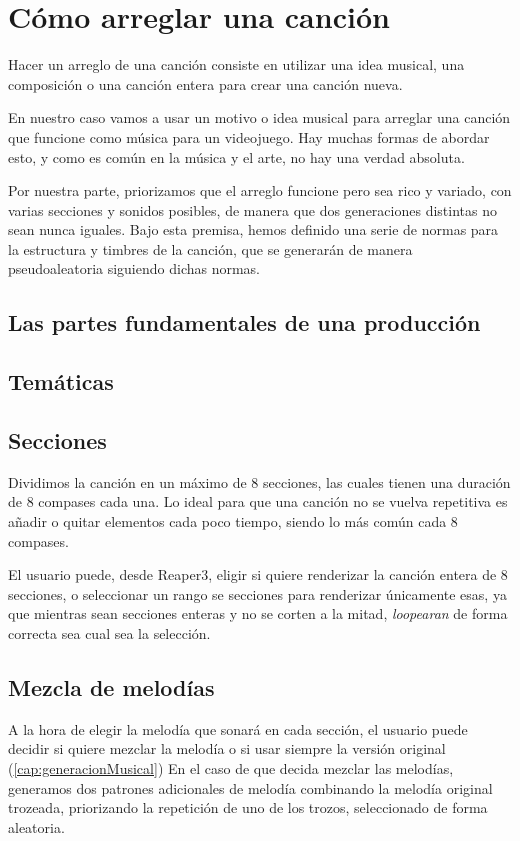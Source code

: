 \chapter{Cómo arreglar una canción}
Hacer un arreglo de una canción consiste en utilizar una idea musical, una composición o una canción entera para crear una canción nueva.

En nuestro caso vamos a usar un motivo o idea musical para arreglar una canción que funcione como música para un videojuego. Hay muchas formas de abordar esto, y como es común en la música y el arte, no hay una verdad absoluta.

Por nuestra parte, priorizamos que el arreglo funcione pero sea rico y variado, con varias secciones y sonidos posibles, de manera que dos generaciones distintas no sean nunca iguales. Bajo esta premisa, hemos definido una serie de normas para la estructura y timbres de la canción, que se generarán de manera pseudoaleatoria siguiendo dichas normas.

\section{Las partes fundamentales de una producción}
\label{sec:fundamentos-producccion-musical}

\section{Temáticas}
\label{sec:tematicas}

\section{Secciones}
\label{sec:secciones}

Dividimos la canción en un máximo de 8 secciones, las cuales tienen una duración de 8 compases cada una. Lo ideal para que una canción no se vuelva repetitiva es añadir o quitar elementos cada poco tiempo, siendo lo más común cada 8 compases.

El usuario puede, desde Reaper3, eligir si quiere renderizar la canción entera de 8 secciones, o seleccionar un rango se secciones para renderizar únicamente esas, ya que mientras sean secciones enteras y no se corten a la mitad, \textit{loopearan} de forma correcta sea cual sea la selección.

\section{Mezcla de melodías}
A la hora de elegir la melodía que sonará en cada sección, el usuario puede decidir si quiere mezclar la melodía o si usar siempre la versión original (\ref{cap:generacionMusical})
En el caso de que decida mezclar las melodías, generamos dos patrones adicionales de melodía combinando la melodía original trozeada, priorizando la repetición de uno de los trozos, seleccionado de forma aleatoria.

